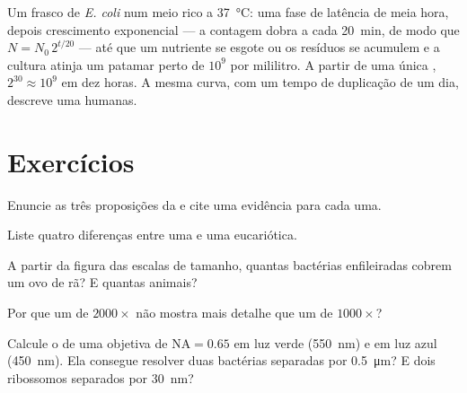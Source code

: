 \begin{example}\label{ex:b1:cell-unit-of-life:growthcurve}
Um frasco de \emph{E. coli} num meio rico a \qty{37}{\celsius}: uma fase
de latência de meia hora, depois crescimento exponencial --- a contagem
dobra a cada \qty{20}{min}, de modo que $N = N_0\,2^{t/20}$ --- até que
um nutriente se esgote ou os resíduos se acumulem e a cultura atinja um
patamar perto de $10^9$  por mililitro. A partir de uma única
, $2^{30} \approx 10^9$  em dez horas. A mesma curva, com
um tempo de duplicação de um dia, descreve uma 
humanas.
\end{example}

\section{Exercícios}

\begin{exercise}[$\star$]\label{exo:b1:cell-unit-of-life:1}
Enuncie as três proposições da  e cite uma evidência para
cada uma.
\end{exercise}

\begin{exercise}[$\star$]\label{exo:b1:cell-unit-of-life:2}
Liste quatro diferenças entre uma  e uma eucariótica.
\end{exercise}

\begin{exercise}[$\star$]\label{exo:b1:cell-unit-of-life:3}
A partir da figura das escalas de tamanho, quantas bactérias enfileiradas
cobrem um ovo de rã? E quantas  animais?
\end{exercise}

\begin{exercise}[$\star$]\label{exo:b1:cell-unit-of-life:4}
Por que um  de $2000\times$ não mostra mais detalhe
que um de $1000\times$?
\end{exercise}

\begin{exercise}[$\star\star$]\label{exo:b1:cell-unit-of-life:5}
Calcule o  de uma objetiva de $\mathrm{NA} = 0.65$ em
luz verde (\qty{550}{nm}) e em luz azul (\qty{450}{nm}). Ela consegue
resolver duas bactérias separadas por \qty{0.5}{\micro m}? E dois
ribossomos separados por \qty{30}{nm}?
\end{exercise}


